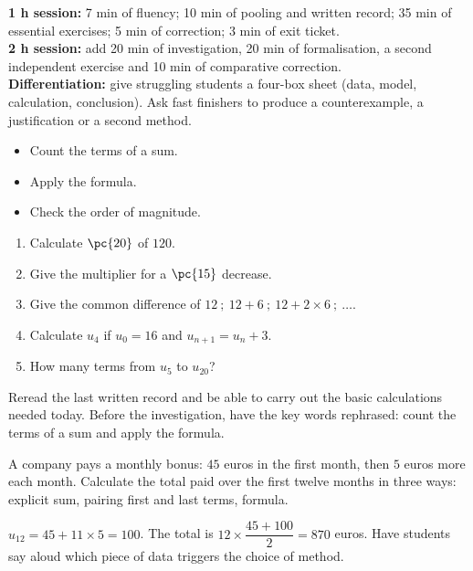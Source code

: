\ifmxteacher
\begin{method}
\textbf{1 h session:} 7 min of fluency; 10 min of pooling and written record; 35 min of essential exercises; 5 min of correction; 3 min of exit ticket.\\
    \textbf{2 h session:} add 20 min of investigation, 20 min of formalisation, a second independent exercise and 10 min of comparative correction.\\
    \textbf{Differentiation:} give struggling students a four-box sheet (data, model, calculation, conclusion). Ask fast finishers to produce a counterexample, a justification or a second method.
\end{method}
\fi
{}
\begin{objectives}\begin{itemize}\item Count the terms of a sum.\item Apply the formula.\item Check the order of magnitude.\end{itemize}\end{objectives}
\begin{fluency}\begin{enumerate}\item Calculate $\pc{20}$ of $120$. \item Give the multiplier for a $\pc{15}$ decrease. \item Give the common difference of $12\ ;\ 12+6\ ;\ 12+2\times6\ ;\ \ldots$. \item Calculate $u_4$ if $u_0=16$ and $u_{n+1}=u_n+3$. \item How many terms from $u_{5}$ to $u_{20}$? \end{enumerate}\end{fluency}
\begin{prerequisites}Reread the last written record and be able to carry out the basic calculations needed today. Before the investigation, have the key words rephrased: count the terms of a sum and apply the formula.\end{prerequisites}

\begin{activity}
A company pays a monthly bonus: $45$ euros in the first month, then $5$ euros more each month. Calculate the total paid over the first twelve months in three ways: explicit sum, pairing first and last terms, formula.

\end{activity}
\begin{solution}$u_{12}=45+11\times5=100$. The total is $12\times\dfrac{45+100}{2}=870$ euros. Have students say aloud which piece of data triggers the choice of method.\end{solution}

